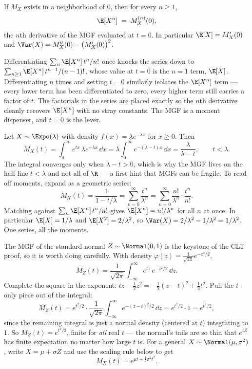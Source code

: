 \begin{proposition}
\label{ch18:prop-mgf-moments}
If $M_X$ exists in a neighborhood of $0$, then for every $n\ge 1$,
\[
  \E[X^n] \;=\; M_X^{(n)}(0),
\]
the $n$th derivative of the MGF evaluated at $t=0$. In particular
$\E[X]=M_X'(0)$ and $\Var(X)=M_X''(0)-\big(M_X'(0)\big)^2$.
\end{proposition}

\begin{whybox}
Differentiating $\sum_n \E[X^n]\,t^n/n!$ once knocks the series down to
$\sum_{n\ge 1}\E[X^n]\,t^{n-1}/(n-1)!$, whose value at $t=0$ is the $n=1$ term,
$\E[X]$. Differentiating $n$ times and setting $t=0$ similarly isolates the
$\E[X^n]$ term --- every lower term has been differentiated to zero, every
higher term still carries a factor of $t$. The factorials in the series are
placed exactly so the $n$th derivative cleanly recovers $\E[X^n]$ with no stray
constants. The MGF is a moment dispenser, and $t=0$ is the lever.
\end{whybox}

\begin{example}
\label{ch18:ex-expo-mgf}
Let $X\sim\Expo(\lambda)$ with density $f(x)=\lambda e^{-\lambda x}$ for
$x\ge 0$. Then
\[
  M_X(t) = \int_0^\infty e^{tx}\,\lambda e^{-\lambda x}\,\dd x
         = \lambda\int_0^\infty e^{-(\lambda-t)x}\,\dd x
         = \frac{\lambda}{\lambda - t},
  \qquad t<\lambda .
\]
The integral converges only when $\lambda - t>0$, which is why the MGF lives on
the half-line $t<\lambda$ and not all of $\R$ --- a first hint that MGFs can be
fragile. To read off moments, expand as a geometric series:
\[
  M_X(t) = \frac{1}{1 - t/\lambda} = \sum_{n=0}^\infty \frac{t^n}{\lambda^n}
         = \sum_{n=0}^\infty \frac{n!}{\lambda^n}\cdot\frac{t^n}{n!}.
\]
Matching against $\sum_n \E[X^n]\,t^n/n!$ gives $\E[X^n]=n!/\lambda^n$ for all
$n$ at once. In particular $\E[X]=1/\lambda$ and $\E[X^2]=2/\lambda^2$, so
$\Var(X)=2/\lambda^2 - 1/\lambda^2 = 1/\lambda^2$. One series, all the moments.
\end{example}

\begin{example}
\label{ch18:ex-normal-mgf}
The MGF of the standard normal $Z\sim\Normal(0,1)$ is the keystone of the CLT
proof, so it is worth doing carefully. With density
$\varphi(z)=\frac{1}{\sqrt{2\pi}}e^{-z^2/2}$,
\[
  M_Z(t) = \frac{1}{\sqrt{2\pi}}\int_{-\infty}^\infty e^{tz}\,e^{-z^2/2}\,\dd z .
\]
Complete the square in the exponent: $tz - \tfrac12 z^2 = -\tfrac12(z-t)^2 +
\tfrac12 t^2$. Pull the $t$-only piece out of the integral:
\[
  M_Z(t) = e^{t^2/2}\cdot
           \frac{1}{\sqrt{2\pi}}\int_{-\infty}^\infty e^{-(z-t)^2/2}\,\dd z
         = e^{t^2/2}\cdot 1 = e^{t^2/2},
\]
since the remaining integral is just a normal density (centered at $t$)
integrating to $1$. So $M_Z(t)=e^{t^2/2}$, finite for \emph{all} real $t$ ---
the normal's tails are so thin that $e^{tZ}$ has finite expectation no matter
how large $t$ is. For a general $X\sim\Normal(\mu,\sigma^2)$, write
$X=\mu+\sigma Z$ and use the scaling rule below to get
\[
  M_X(t) = e^{\mu t + \frac12 \sigma^2 t^2}.
\]
\end{example}

